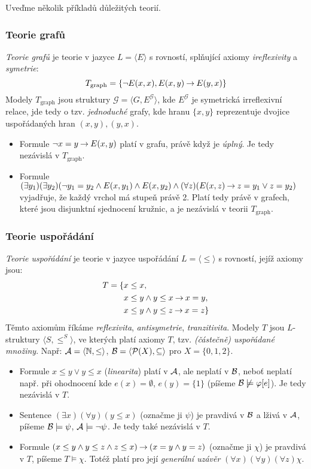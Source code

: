 Uveďme několik příkladů důležitých teorií.

\subsubsection{Teorie grafů}
\emph{Teorie grafů} je teorie v jazyce $L=\langle E\rangle$ s rovností, splňující axiomy \emph{ireflexivity} a \emph{symetrie}:
$$
T_\text{graph}=\{\neg E(x, x),E(x,y)\mathbin{\rightarrow} E(y,x)\}
$$
Modely $T_\text{graph}$ jsou struktury $\mathcal G=\langle G,E^\mathcal G\rangle$, kde $E^\mathcal G$ je symetrická irreflexivní relace, jde tedy o tzv. \emph{jednoduché} grafy, kde hranu $\{x,y\}$ reprezentuje dvojice uspořádaných hran $(x,y),(y,x)$.
\begin{itemize}
    \item Formule $\neg x=y\mathbin{\rightarrow} E(x,y)$ platí v grafu, právě když je \emph{úplný}. Je tedy nezávislá v $T_\text{graph}$.
    \item Formule $(\exists y_1)(\exists y_2)(\neg y_1=y_2\land E(x,y_1)\land E(x,y_2)\land (\forall z)(E(x,z)\mathbin{\rightarrow} z=y_1\lor z=y_2)$ vyjadřuje, že každý vrchol má stupeň právě 2. Platí tedy právě v grafech, které jsou disjunktní sjednocení kružnic, a je nezávislá v teorii $T_\text{graph}$.
\end{itemize}


\subsubsection{Teorie uspořádání}

\emph{Teorie uspořádání} je teorie v jazyce uspořádání $L=\langle\leq\rangle$ s rovností, jejíž axiomy jsou:
\begin{align*}
    T=\{& x\leq x,\\
        & x\leq y\land y\leq x\mathbin{\rightarrow} x=y,\\
        & x\leq y\land y\leq z\mathbin{\rightarrow} x=z\}\\
\end{align*}
Těmto axiomům říkáme \emph{reflexivita}, \emph{antisymetrie}, \emph{tranzitivita}. Modely $T$ jsou $L$-struktury $\langle S,\leq^S\rangle$, ve kterých platí axiomy $T$, tzv. \emph{(částečně) uspořádané množiny}. Např: $\mathcal{A}=\langle\mathbb N,\leq\rangle$, $\mathcal{B}=\langle\mathcal P(X),\subseteq\rangle$ pro $X=\{0,1,2\}$.
\begin{itemize}
    \item Formule $x\leq y\lor y\leq x$ (\emph{linearita}) platí v $\mathcal{A}$, ale neplatí v $\mathcal{B}$, neboť neplatí např. při ohodnocení kde $e(x)=\emptyset$, $e(y)=\{1\}$ (píšeme $\mathcal{B}\not\models\varphi[e]$). Je tedy nezávislá v $T$.
    \item Sentence $(\exists x)(\forall y)(y\leq x)$ (označme ji $\psi$) je pravdivá v $\mathcal{B}$ a lživá v $\mathcal{A}$, píšeme $\mathcal{B}\models\psi$, $\mathcal{A}\models\neg\psi$. Je tedy také nezávislá v $T$.
    \item Formule $(x\leq y\land y\leq z\land z\leq x)\mathbin{\rightarrow} (x=y\land y=z)$ (označme ji $\chi$) je pravdivá v $T$, píšeme $T\models\chi$. Totéž platí pro její \emph{generální uzávěr} $(\forall x)(\forall y)(\forall z)\chi$.
\end{itemize}

